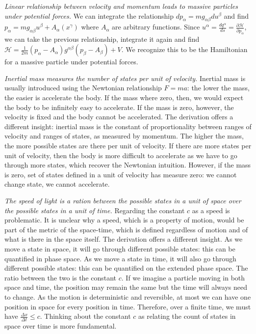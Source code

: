 \documentclass[twocolumn]{article}
\begin{document}
\emph{Linear relationship between velocity and momentum leads to massive particles under potential forces.} We can integrate the relationship $dp_\alpha = m g_{\alpha \beta} du^\beta$ and find $p_\alpha = m g_{\alpha \beta} u^\beta + A_\alpha(x^\gamma)$ where $A_\alpha$ are arbitrary functions. Since $u^\alpha = \frac{dq^\alpha}{ds} = \frac{\partial \mathcal{H}}{\partial p_\alpha}$, we can take the previous relationship, integrate it again and find $\mathcal{H} = \frac{1}{2m} (p_{\alpha} - A_\alpha) g^{\alpha \beta} (p_{\beta} - A_\beta) + V$. We recognize this to be the Hamiltonian for a massive particle under potential forces.

\emph{Inertial mass measures the number of states per unit of velocity.} Inertial mass is usually introduced using the Newtonian relationship $F=ma$: the lower the mass, the easier is accelerate the body. If the mass where zero, then, we would expect the body to be infinitely easy to accelerate. If the mass is zero, however, the velocity is fixed and the body cannot be accelerated. The derivation offers a different insight: inertial mass is the constant of proportionality between ranges of velocity and ranges of states, as measured by momentum. The higher the mass, the more possible states are there per unit of velocity. If there are more states per unit of velocity, then the body is more difficult to accelerate as we have to go through more states, which recover the Newtonian intuition. However, if the mass is zero, set of states defined in a unit of velocity has measure zero: we cannot change state, we cannot accelerate.

\emph{The speed of light is a ration between the possible states in a unit of space over the possible states in a unit of time.} Regarding the constant $c$ as a speed is problematic. It is unclear why a speed, which is a property of motion, would be part of the metric of the space-time, which is defined regardless of motion and of what is there in the space itself. The derivation offers a different insight. As we move a state in space, it will go through different possible states: this can be quantified in phase space. As we move a state in time, it will also go through different possible states: this can be quantified on the extended phase space. The ratio between the two is the constant $c$. If we imagine a particle moving in both space and time, the position may remain the same but the time will always need to change. As the motion is deterministic and reversible, at most we can have one position in space for every position in time. Therefore, over a finite time, we must have $\frac{\Delta x}{\Delta t} \leq c$. Thinking about the constant $c$ as relating the count of states in space over time is more fundamental.
\end{document}
